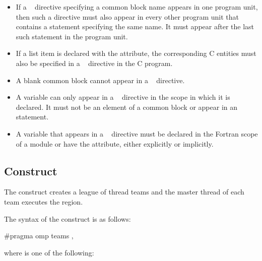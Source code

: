 \begin{itemize}
\item If a ~ directive specifying a common 
      block name appears in one program unit, then such a directive must 
      also appear in every other program unit that contains a  
      statement specifying the same name. It must appear after the last 
      such  statement in the program unit.

\item If a list item is declared with the  attribute, the 
      corresponding C entities must also be specified in a 
      ~ directive in the C program.

\item A blank common block cannot appear in a ~ 
      directive.

\item A variable can only appear in a ~ directive 
      in the scope in which it is declared. It must not be an element of a 
      common block or appear in an  statement.

\item A variable that appears in a ~ directive 
      must be declared in the Fortran scope of a module or have the 
       attribute, either explicitly or implicitly. 
\end{itemize}
\fortranspecificend







\subsection{ Construct}
\label{subsec:teams Construct}
\summary
The  construct creates a league of thread teams and the master thread of each 
team executes the region.

\syntax
\ccppspecificstart
The syntax of the  construct is as follows:

\begin{boxedcode}
\#pragma omp teams \plc{[clause[ [},\plc{] clause] ... ] new-line}
\end{boxedcode}

where  is one of the following:

